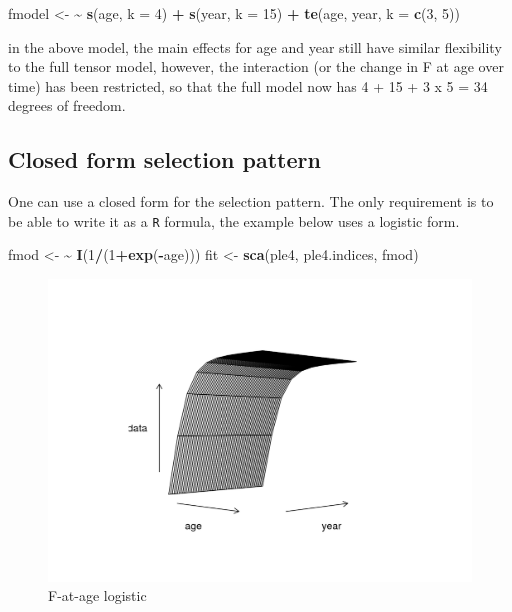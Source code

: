 \documentclass[
]{book}
\newenvironment{Shaded}{\begin{snugshade}}{\end{snugshade}}
\newcommand{\AttributeTok}[1]{\textcolor[rgb]{0.13,0.29,0.53}{#1}}
\newcommand{\DecValTok}[1]{\textcolor[rgb]{0.00,0.00,0.81}{#1}}
\newcommand{\ErrorTok}[1]{\textcolor[rgb]{0.64,0.00,0.00}{\textbf{#1}}}
\newcommand{\FunctionTok}[1]{\textcolor[rgb]{0.13,0.29,0.53}{\textbf{#1}}}
\newcommand{\NormalTok}[1]{#1}
\newcommand{\OtherTok}[1]{\textcolor[rgb]{0.56,0.35,0.01}{#1}}
\newcommand{\SpecialCharTok}[1]{\textcolor[rgb]{0.81,0.36,0.00}{\textbf{#1}}}
\begin{document}
\begin{Shaded}
\begin{Highlighting}[]
\NormalTok{fmodel }\OtherTok{\textless{}{-}} \ErrorTok{\textasciitilde{}} \FunctionTok{s}\NormalTok{(age, }\AttributeTok{k =} \DecValTok{4}\NormalTok{) }\SpecialCharTok{+} \FunctionTok{s}\NormalTok{(year, }\AttributeTok{k =} \DecValTok{15}\NormalTok{) }\SpecialCharTok{+} \FunctionTok{te}\NormalTok{(age, year, }\AttributeTok{k =} \FunctionTok{c}\NormalTok{(}\DecValTok{3}\NormalTok{, }\DecValTok{5}\NormalTok{))}
\end{Highlighting}
\end{Shaded}

in the above model, the main effects for age and year still have similar flexibility to the full tensor model, however, the interaction (or the change in F at age over time) has been restricted, so that the full model now has 4 + 15 + 3 x 5 = 34 degrees of freedom.

\hypertarget{closed-form-selection-pattern}{%
\subsection{Closed form selection pattern}\label{closed-form-selection-pattern}}

One can use a closed form for the selection pattern. The only requirement is to be able to write it as a \texttt{R} formula, the example below uses a logistic form.

\begin{Shaded}
\begin{Highlighting}[]
\NormalTok{fmod }\OtherTok{\textless{}{-}} \ErrorTok{\textasciitilde{}} \FunctionTok{I}\NormalTok{(}\DecValTok{1}\SpecialCharTok{/}\NormalTok{(}\DecValTok{1}\SpecialCharTok{+}\FunctionTok{exp}\NormalTok{(}\SpecialCharTok{{-}}\NormalTok{age)))}
\NormalTok{fit }\OtherTok{\textless{}{-}} \FunctionTok{sca}\NormalTok{(ple4, ple4.indices, fmod)}
\end{Highlighting}
\end{Shaded}

\begin{figure}
\centering
\includegraphics{_bookdown_files/_main_files/figure-html/logistic-1.png}
\caption{\label{fig:logistic}F-at-age logistic}
\end{figure}
\end{document}
